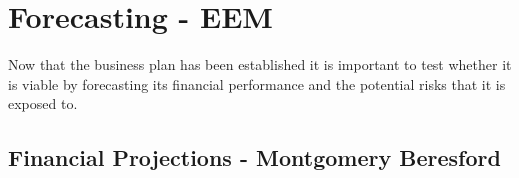 \documentclass[11pt]{article}		%
\newcommand{\sectref}[1]{\hyperref[#1]{Section \ref*{#1}}}     %
\begin{document}
            
 	\section{Forecasting - EEM}
 	
 	Now that the business plan has been established it is important to test whether it is viable by forecasting its financial performance and the potential risks that it is exposed to.
 	\label{forecasting}
 
	        \subsection[Financial Projections]{Financial Projections - Montgomery Beresford}
		        	        \label{financialModels}
	        	        
\end{document}
